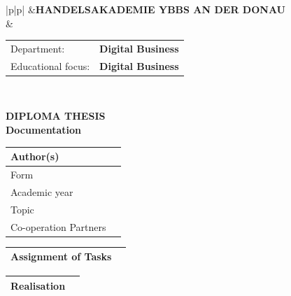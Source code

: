 \begin{tabular}{|p{\haklogobreite}|p{\beschriftungsbreite}|}
	\hline
	&{\vspace{0.15em}\textbf{HANDELSAKADEMIE YBBS AN DER DONAU}}\\[1.05em]
	\cline{2-2}
	& { \begin{tabular}{p{\feldA} p{\feldB}}
    		Department:&\textbf{Digital Business}\\
			Educational focus:&\textbf{Digital Business}\\
		\end{tabular}
	}\\
	\hline
\end{tabular}

\begin{center}
 \LARGE \textbf{DIPLOMA THESIS}\\
 \Large \textbf{Documentation}\\
 \normalsize
\end{center}

\linespread{1.1} \normalsize
\begin{tabular}{|p{\feldC}|p{\feldD}|}
 \hline
 Author(s) & \\
 \hline
 Form & \\ Academic year & \\
 \hline
 Topic & \\
 \hline
 Co-operation Partners & \\
 \hline
\end{tabular}

\begin{tabular}{|p{\feldC}|p{\feldD}|}
 \hline
 Assignment of Tasks & \\
 \hline
\end{tabular}

\begin{tabular}{|p{\feldC}|p{\feldD}|}
 \hline
 Realisation & \\
 \hline
\end{tabular}

